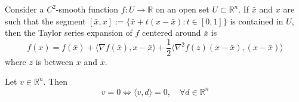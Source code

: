 \begin{theorem}
    Consider a $C^2$-smooth function $f: U \rightarrow \mathbb R$ on an open set $U \subset \mathbb R^n$. If $\bar x$ and $x$ are such that the segment $[\bar x, x] := \{\bar x + t(x - \bar x): t \in [0,1]\}$ is contained in $U$, then the Taylor series expansion of $f$ centered around $\bar x$ is
    $$f(x) = f(\bar x) + \langle \nabla f(\bar x), x - \bar x \rangle + \frac{1}{2} \langle \nabla^2 f(z) (x - \bar x), (x - \bar x) \rangle$$
    where $z$ is between $x$ and $\bar x$.
\end{theorem}
\begin{lemma}
    Let $v \in \mathbb R^n$. Then $$v = 0 \iff \langle v,d \rangle = 0, \quad \forall d \in \mathbb R^n$$
\end{lemma}

% 